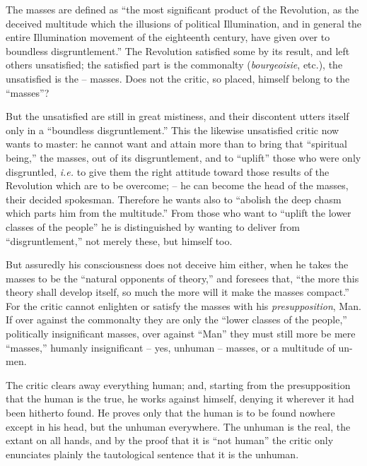 \documentclass[12pt,a4paper]{book}
\begin{document}
The masses are defined as ``the most significant product of the Revolution, 
as the deceived multitude which the illusions of political Illumination, and 
in general the entire Illumination movement of the eighteenth century, have 
given over to boundless disgruntlement.'' The Revolution satisfied some by 
its result, and left others unsatisfied; the satisfied part is the commonalty 
(\textit{bourgeoisie}, etc.), the unsatisfied is the -- masses. Does not the 
critic, so placed, himself belong to the ``masses''?

But the unsatisfied are still in great mistiness, and their discontent utters 
itself only in a ``boundless disgruntlement.'' This the likewise unsatisfied 
critic now wants to master: he cannot want and attain more than to bring that 
``spiritual being,'' the masses, out of its disgruntlement, and to 
``uplift'' those who were only disgruntled, \textit{i.e.} to give them the 
right attitude toward those results of the Revolution which are to be 
overcome; -- he can become the head of the masses, their decided spokesman. 
Therefore he wants also to ``abolish the deep chasm which parts him from the 
multitude.'' From those who want to ``uplift the lower classes of the 
people'' he is distinguished by wanting to deliver from ``disgruntlement,'' 
not merely these, but himself too.

But assuredly his consciousness does not deceive him either, when he takes the 
masses to be the ``natural opponents of theory,'' and foresees that, ``the 
more this theory shall develop itself, so much the more will it make the 
masses compact.'' For the critic cannot enlighten or satisfy the masses with 
his \textit{presupposition}, Man. If over against the commonalty they are only 
the ``lower classes of the people,'' politically insignificant masses, over 
against ``Man'' they must still more be mere ``masses,'' humanly 
insignificant -- yes, unhuman -- masses, or a multitude of un-men.

The critic clears away everything human; and, starting from the presupposition 
that the human is the true, he works against himself, denying it wherever it 
had been hitherto found. He proves only that the human is to be found nowhere 
except in his head, but the unhuman everywhere. The unhuman is the real, the 
extant on all hands, and by the proof that it is ``not human'' the critic 
only enunciates plainly the tautological sentence that it is the unhuman.
\end{document}
